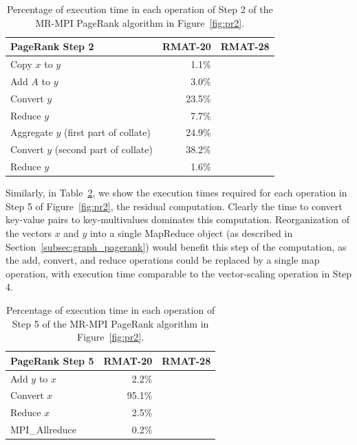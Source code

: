 \begin{table}[htb]
\begin{center}
\begin{tabular}{|l|r|r|}
\hline 
PageRank Step 2 & RMAT-20 & RMAT-28 \\
\hline
Copy $x$ to $y$ & 1.1\% &  \\
Add $A$ to $y$ & 3.0\% &  \\
Convert $y$ & 23.5\% &  \\
Reduce $y$ & 7.7\% & \\
Aggregate $y$ (first part of collate) & 24.9\% & \\
Convert $y$ (second part of collate) & 38.2\% & \\
Reduce $y$ & 1.6\% & \\
\hline
\end{tabular}
\caption{Percentage of execution time in each operation of Step 2 of the MR-MPI 
PageRank algorithm in Figure~\ref{fig:pr2}.}
\label{table:prdetail2}
\end{center}
\end{table}

Similarly, in Table~\ref{table:prdetail5}, we show the execution times 
required for each operation in Step 5 of Figure~\ref{fig:pr2}, the 
residual computation.  Clearly the time to convert key-value pairs to 
key-multivalues dominates this computation.  Reorganization of the vectors
$x$ and $y$ into a single MapReduce object (as described in 
Section~\ref{subsec:graph_pagerank}) would benefit this step of the computation,
as the add, convert, and reduce operations could be replaced by a single 
map operation, with execution time comparable to the vector-scaling operation
in Step 4.

\begin{table}[htb]
\begin{center}
\begin{tabular}{|l|r|r|}
\hline 
PageRank Step 5 & RMAT-20 & RMAT-28 \\
\hline
Add $y$ to $x$ & 2.2\% &  \\
Convert $x$ & 95.1\% &  \\
Reduce $x$ & 2.5\% & \\
MPI\_Allreduce & 0.2\% & \\
\hline
\end{tabular}
\caption{Percentage of execution time in each operation of Step 5 of the MR-MPI 
PageRank algorithm in  Figure~\ref{fig:pr2}.}
\label{table:prdetail5}
\end{center}
\end{table}
%

